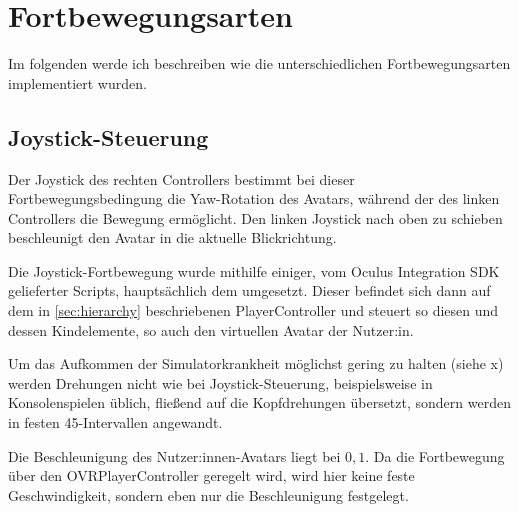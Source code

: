 \section{Fortbewegungsarten}
Im folgenden werde ich beschreiben wie die unterschiedlichen Fortbewegungsarten implementiert wurden.

\subsection{Joystick-Steuerung} \label{subsec:joystick-implementation}
    Der Joystick des rechten Controllers bestimmt bei dieser Fortbewegungsbedingung die Yaw-Rotation des Avatars, während der des linken Controllers die Bewegung ermöglicht. Den linken Joystick nach oben zu schieben beschleunigt den Avatar in die aktuelle Blickrichtung.

    Die Joystick-Fortbewegung wurde mithilfe einiger, vom Oculus Integration SDK gelieferter Scripts, hauptsächlich dem  umgesetzt. Dieser befindet sich dann auf dem in \autoref{sec:hierarchy} beschriebenen PlayerController und steuert so diesen und dessen Kindelemente, so auch den virtuellen Avatar der Nutzer:in.

    Um das Aufkommen der Simulatorkrankheit möglichst gering zu halten (siehe x) %
    werden Drehungen nicht wie bei Joystick-Steuerung, beispielsweise in Konsolenspielen üblich, fließend auf die Kopfdrehungen übersetzt, sondern werden in festen
    45\textdegree-Intervallen angewandt.

    Die Beschleunigung des Nutzer:innen-Avatars liegt bei $0,1$. Da die Fortbewegung über den OVRPlayerController geregelt wird, wird hier keine feste Geschwindigkeit, sondern eben nur die Beschleunigung festgelegt.

